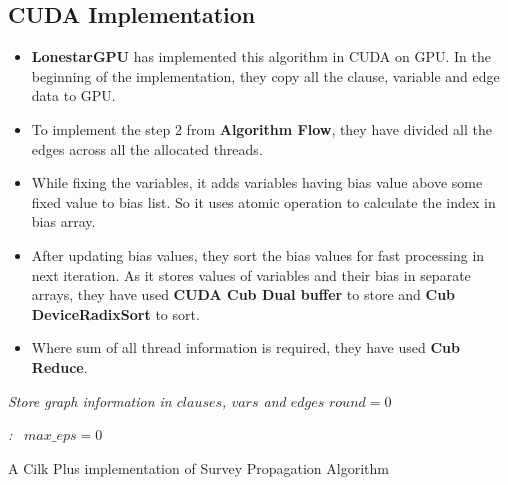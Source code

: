 \documentclass{article}
\begin{document}
\subsection{CUDA Implementation}
\begin{itemize}
\item \textbf{LonestarGPU} has implemented this algorithm in CUDA on GPU. In the beginning of the implementation, they copy all the clause, variable and edge data to GPU. 
\item To implement the step 2 from \textbf{Algorithm Flow}, they have divided all the edges across all the allocated threads. 
\item While fixing the variables, it adds variables having bias value above some fixed value to bias list. So it uses atomic operation to calculate the index in bias array.  
\item After updating bias values, they sort the bias values for fast processing in next iteration. As it stores values of variables and their bias in separate arrays, they have used \textbf{CUDA Cub Dual buffer} to store and \textbf{Cub DeviceRadixSort} to sort. 
\item Where sum of all thread information is required, they have used \textbf{Cub Reduce}.
\end{itemize}

\IncMargin{1em}
\begin{algorithm}
	
	\BlankLine
    \emph{Store graph information in $clauses$, $vars$ and $edges$}\;
    \emph{$round = 0$}\;
    \BlankLine
    

\BlankLine
\emph{\Converge{} :}\
\BlankLine
\emph{$max\_eps = 0$}\;
\caption{ A Cilk Plus implementation of Survey Propagation Algorithm}\label{algo:Par_SP}
\end{algorithm}\DecMargin{1em}
\end{document}
